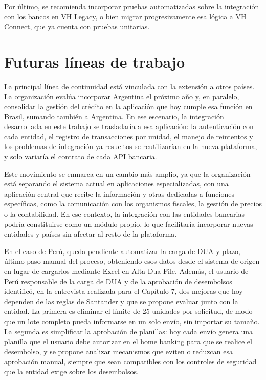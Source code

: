Por último, se recomienda incorporar pruebas automatizadas sobre la integración con los bancos en VH Legacy, o bien migrar progresivamente esa lógica a VH Connect, que ya cuenta con pruebas unitarias.

\section{Futuras líneas de trabajo}

La principal línea de continuidad está vinculada con la extensión a otros países. La organización evalúa incorporar Argentina el próximo año y, en paralelo, consolidar la gestión del crédito en la aplicación que hoy cumple esa función en Brasil, sumando también a Argentina. En ese escenario, la integración desarrollada en este trabajo se trasladaría a esa aplicación: la autenticación con cada entidad, el registro de transacciones por unidad, el manejo de reintentos y los problemas de integración ya resueltos se reutilizarían en la nueva plataforma, y solo variaría el contrato de cada API bancaria.

Este movimiento se enmarca en un cambio más amplio, ya que la organización está separando el sistema actual en aplicaciones especializadas, con una aplicación central que recibe la información y otras dedicadas a funciones específicas, como la comunicación con los organismos fiscales, la gestión de precios o la contabilidad. En ese contexto, la integración con las entidades bancarias podría constituirse como un módulo propio, lo que facilitaría incorporar nuevas entidades y países sin afectar al resto de la plataforma.

En el caso de Perú, queda pendiente automatizar la carga de DUA y plazo, último paso manual del proceso, obteniendo esos datos desde el sistema de origen en lugar de cargarlos mediante Excel en Alta Dua File. Además, el usuario de Perú responsable de la carga de DUA y de la aprobación de desembolsos identificó, en la entrevista realizada para el Capítulo 7, dos mejoras que hoy dependen de las reglas de Santander y que se propone evaluar junto con la entidad. La primera es eliminar el límite de 25 unidades por solicitud, de modo que un lote completo pueda informarse en un solo envío, sin importar su tamaño. La segunda es simplificar la aprobación de planillas: hoy cada envío genera una planilla que el usuario debe autorizar en el home banking para que se realice el desembolso, y se propone analizar mecanismos que eviten o reduzcan esa aprobación manual, siempre que sean compatibles con los controles de seguridad que la entidad exige sobre los desembolsos.

